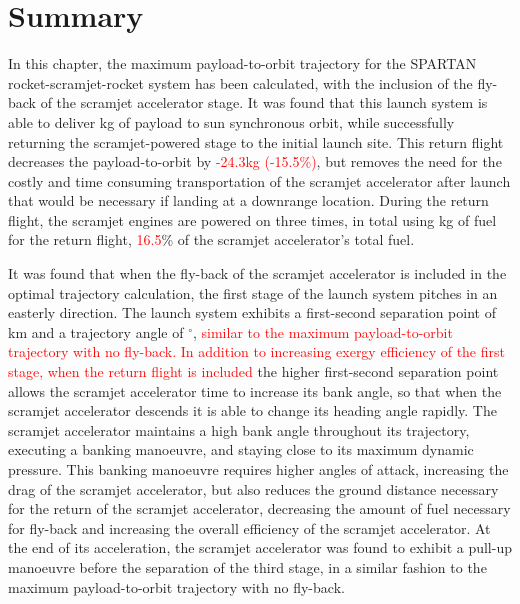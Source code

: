 \section{Summary}

In this chapter, the maximum payload-to-orbit trajectory for the SPARTAN rocket-scramjet-rocket system has been calculated, with the inclusion of the fly-back of the scramjet accelerator stage. It was found that this launch system is able to deliver \PayloadToOrbitStandard kg of payload to sun synchronous orbit, while successfully returning the scramjet-powered stage to the initial launch site. 
This return flight decreases the payload-to-orbit by \textcolor{red}{-24.3kg (-15.5\%)}, but removes the need for the costly and time consuming transportation of the scramjet accelerator after launch that would be necessary if landing at a downrange location.
During the return flight, the scramjet engines are powered on three times, in total using \returnFuelStandard kg of fuel for the return flight, \textcolor{red}{16.5}\% of the scramjet accelerator's total fuel.

It was found that when the fly-back of the scramjet accelerator is included in the optimal trajectory calculation, the first stage of the launch system pitches in an easterly direction. 
The launch system exhibits a first-second separation point of \firstsecondSeparationAltStandard km and a trajectory angle of \firstsecondSeparationgammaStandard $^\circ$, \textcolor{red}{similar to the maximum payload-to-orbit trajectory with no fly-back. 
In addition to increasing exergy efficiency of the first stage, when the return flight is included} the higher first-second separation point allows the scramjet accelerator time to increase its bank angle, so that when the scramjet accelerator descends it is able to change its heading angle rapidly. The scramjet accelerator maintains a high bank angle throughout its trajectory, executing a banking manoeuvre, and staying close to its maximum dynamic pressure. 
This banking manoeuvre requires higher angles of attack, increasing the drag of the scramjet accelerator, but also reduces the ground distance necessary for the return of the scramjet accelerator, decreasing the amount of fuel necessary for fly-back and increasing the overall efficiency of the scramjet accelerator. 
At the end of its acceleration, the scramjet accelerator was found to exhibit a pull-up manoeuvre before the separation of the third stage, in a similar fashion to the maximum payload-to-orbit trajectory with no fly-back. 

